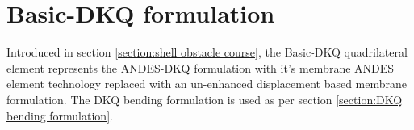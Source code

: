 
\chapter{Basic-DKQ formulation}
\label{sec:Basic-DKQ quadrilateral formulation}
\renewcommand{\Thema}{Basic-DKQ quadrilateral formulation}

Introduced in section \ref{section:shell obstacle course}, the Basic-DKQ quadrilateral element represents the ANDES-DKQ formulation with it's membrane ANDES element technology replaced with an un-enhanced displacement based membrane formulation. The DKQ bending formulation is used as per section \ref{section:DKQ bending formulation}.

